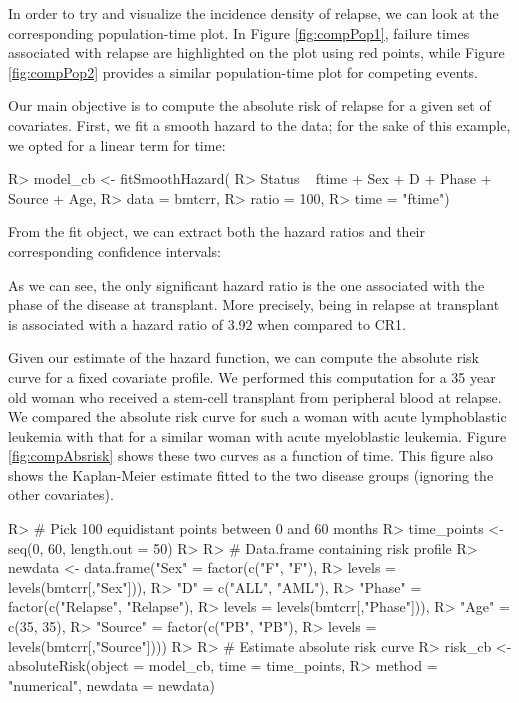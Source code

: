 \documentclass[
]{jss}
\begin{document}
In order to try and visualize the incidence density of relapse, we can
look at the corresponding population-time plot. In Figure
\ref{fig:compPop1}, failure times associated with relapse are
highlighted on the plot using red points, while Figure
\ref{fig:compPop2} provides a similar population-time plot for competing
events.

Our main objective is to compute the absolute risk of relapse for a
given set of covariates. First, we fit a smooth hazard to the data; for
the sake of this example, we opted for a linear term for time:

\begin{CodeChunk}

\begin{CodeInput}
R> model_cb <- fitSmoothHazard(
R>     Status ~ ftime + Sex + D + Phase + Source + Age, 
R>     data = bmtcrr, 
R>     ratio = 100, 
R>     time = "ftime")
\end{CodeInput}
\end{CodeChunk}

From the fit object, we can extract both the hazard ratios and their
corresponding confidence intervals:

As we can see, the only significant hazard ratio is the one associated
with the phase of the disease at transplant. More precisely, being in
relapse at transplant is associated with a hazard ratio of 3.92 when
compared to CR1.

Given our estimate of the hazard function, we can compute the absolute
risk curve for a fixed covariate profile. We performed this computation
for a 35 year old woman who received a stem-cell transplant from
peripheral blood at relapse. We compared the absolute risk curve for
such a woman with acute lymphoblastic leukemia with that for a similar
woman with acute myeloblastic leukemia. Figure \ref{fig:compAbsrisk}
shows these two curves as a function of time. This figure also shows the
Kaplan-Meier estimate fitted to the two disease groups (ignoring the
other covariates).

\begin{CodeChunk}

\begin{CodeInput}
R> # Pick 100 equidistant points between 0 and 60 months
R> time_points <- seq(0, 60, length.out = 50)
R> 
R> # Data.frame containing risk profile
R> newdata <- data.frame("Sex" = factor(c("F", "F"), 
R>                                      levels = levels(bmtcrr[,"Sex"])),
R>                       "D" = c("ALL", "AML"),
R>                       "Phase" = factor(c("Relapse", "Relapse"), 
R>                                        levels = levels(bmtcrr[,"Phase"])),
R>                       "Age" = c(35, 35),
R>                       "Source" = factor(c("PB", "PB"), 
R>                                         levels = levels(bmtcrr[,"Source"])))
R> 
R> # Estimate absolute risk curve
R> risk_cb <- absoluteRisk(object = model_cb, time = time_points,
R>                         method = "numerical", newdata = newdata)
\end{CodeInput}
\end{CodeChunk}
\end{document}
